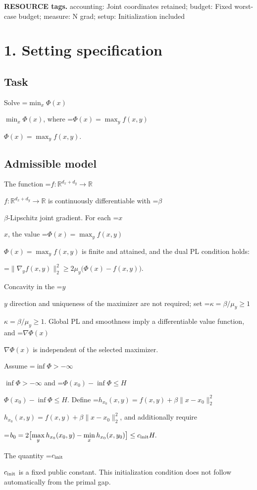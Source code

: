 \documentclass[10pt,a4paper]{article}
\newcommand{\AtlasMath}[1]{\par\begingroup\centering\setbox0=\hbox{$\displaystyle #1$}\ifdim\wd0>1.4\linewidth\typeout{ATLAS WIDE FORMULA: \the\wd0}\fi\ifdim\wd0>\linewidth\resizebox{\linewidth}{!}{\box0}\else\box0\fi\par\endgroup}
\newcommand{\AtlasInlineMath}[1]{\begingroup\setbox0=\hbox{$#1$}\ifdim\wd0>.4\linewidth\endgroup\AtlasMath{#1}\else\endgroup$#1$\fi}
\begin{document}
\textbf{RESOURCE tags.} accounting: Joint coordinates retained; budget: Fixed worst-case budget; measure: N grad; setup: Initialization included



\section{1. Setting specification}


\subsection{Task}


Solve \AtlasInlineMath{\min_x\Phi(x)}, where \AtlasInlineMath{\Phi(x)=\max_yf(x,y)}.



\subsection{Admissible model}


The function \AtlasInlineMath{f:\mathbb{R}^{d_x+d_y}\to\mathbb{R}} is continuously differentiable with \AtlasInlineMath{\beta}-Lipschitz joint gradient. For each \AtlasInlineMath{x}, the value \AtlasInlineMath{\Phi(x)=\max_y f(x,y)} is finite and attained, and the dual PL condition holds:




\AtlasMath{\|\nabla_y f(x,y)\|_2^2\ge2\mu_y\bigl(\Phi(x)-f(x,y)\bigr).}




Concavity in the \AtlasInlineMath{y} direction and uniqueness of the maximizer are not required; set \AtlasInlineMath{\kappa=\beta/\mu_y\ge1}. Global PL and smoothness imply a differentiable value function, and \AtlasInlineMath{\nabla\Phi(x)} is independent of the selected maximizer.



Assume \AtlasInlineMath{\inf\Phi> -\infty} and \AtlasInlineMath{\Phi(x_0)-\inf\Phi\le H}. Define \AtlasInlineMath{h_{x_0}(x,y)=f(x,y)+\beta\|x-x_0\|_2^2}, and additionally require




\AtlasMath{b_0=2\bigl[\max_yh_{x_0}(x_0,y)-\min_xh_{x_0}(x,y_0)\bigr]\le c_{\rm init}H.}




The quantity \AtlasInlineMath{c_{\rm init}} is a fixed public constant. This initialization condition does not follow automatically from the primal gap.
\end{document}

